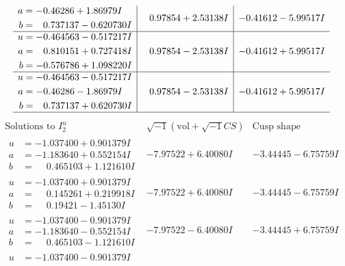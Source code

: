 \documentclass[1p]{elsarticle_modified}
\theoremstyle{definition}
\newcommand{\I}{\sqrt{-1}}
\begin{document}
$$\begin{array}{c|c|c}
\begin{aligned}
a &= -0.46286 + 1.86979 I \\
b &= \phantom{-}0.737137 - 0.620730 I\end{aligned}
 & \phantom{-}0.97854 + 2.53138 I & -0.41612 - 5.99517 I \\ \hline\begin{aligned}
u &= -0.464563 - 0.517217 I \\
a &= \phantom{-}0.810151 + 0.727418 I \\
b &= -0.576786 + 1.098220 I\end{aligned}
 & \phantom{-}0.97854 - 2.53138 I & -0.41612 + 5.99517 I \\ \hline\begin{aligned}
u &= -0.464563 - 0.517217 I \\
a &= -0.46286 - 1.86979 I \\
b &= \phantom{-}0.737137 + 0.620730 I\end{aligned}
 & \phantom{-}0.97854 - 2.53138 I & -0.41612 + 5.99517 I\\
 \hline 
 \end{array}$$\newpage$$\begin{array}{c|c|c}  
\text{Solutions to }I^u_{2}& \I (\text{vol} + \sqrt{-1}CS) & \text{Cusp shape}\\
 \hline 
\begin{aligned}
u &= -1.037400 + 0.901379 I \\
a &= -1.183640 + 0.552154 I \\
b &= \phantom{-}0.465103 + 1.121610 I\end{aligned}
 & -7.97522 + 6.40080 I & -3.44445 - 6.75759 I \\ \hline\begin{aligned}
u &= -1.037400 + 0.901379 I \\
a &= \phantom{-}0.145261 + 0.219918 I \\
b &= \phantom{-}0.19421 - 1.45130 I\end{aligned}
 & -7.97522 + 6.40080 I & -3.44445 - 6.75759 I \\ \hline\begin{aligned}
u &= -1.037400 - 0.901379 I \\
a &= -1.183640 - 0.552154 I \\
b &= \phantom{-}0.465103 - 1.121610 I\end{aligned}
 & -7.97522 - 6.40080 I & -3.44445 + 6.75759 I \\ \hline\begin{aligned}
u &= -1.037400 - 0.901379 I \\

\end{aligned}
\end{array}$$
\end{document}
